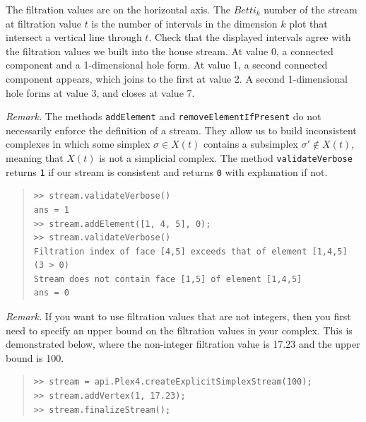 \documentclass[amscd, amssymb, verbatim]{amsart}[12pt]
\theoremstyle{remark}
\theoremstyle{remark}
\theoremstyle{remark}
\begin{document}
The filtration values are on the horizontal axis. The $Betti_k$ number of the stream at filtration value $t$ is the number of intervals in the dimension $k$ plot that intersect a vertical line through $t$. Check that the displayed intervals agree with the filtration values we built into the house stream. At value 0, a connected component and a 1-dimensional hole form. At value 1, a second connected component appears, which joins to the first at value 2. A second 1-dimensional hole forms at value 3, and closes at value 7. 

{\em Remark.} The methods \texttt{addElement} and \texttt{removeElementIfPresent} do not necessarily enforce the definition of a stream. They allow us to build inconsistent complexes in which some simplex $\sigma \in X(t)$ contains a subsimplex $\sigma' \notin X(t)$, meaning that $X(t)$ is not a simplicial complex. The method \texttt{validateVerbose} returns \texttt{1} if our stream is consistent and returns \texttt{0} with explanation if not. 

\begin{quote} \begin{verbatim}
>> stream.validateVerbose()
ans = 1
>> stream.addElement([1, 4, 5], 0);
>> stream.validateVerbose()
Filtration index of face [4,5] exceeds that of element [1,4,5] (3 > 0)
Stream does not contain face [1,5] of element [1,4,5]
ans = 0
\end{verbatim} \end{quote}

{\em Remark.} If you want to use filtration values that are not integers, then you first need to specify an upper bound on the filtration values in your complex. This is demonstrated below, where the non-integer filtration value is 17.23 and the upper bound is 100.

\begin{quote} \begin{verbatim}
>> stream = api.Plex4.createExplicitSimplexStream(100);
>> stream.addVertex(1, 17.23);
>> stream.finalizeStream();
\end{verbatim} \end{quote}


\end{document}
